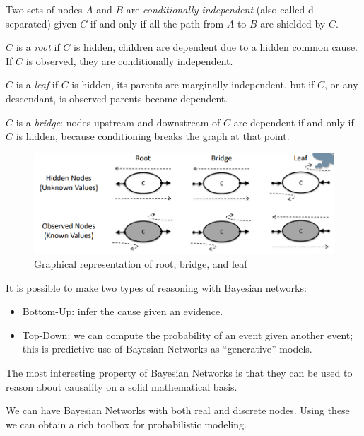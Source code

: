 \documentclass[12pt, a4paper]{report}
\begin{document}
    \begin{definition}
        Two sets of nodes $A$ and $B$ are \emph{conditionally independent} (also called d-separated) given $C$ if and only if all the path from $A$ to $B$ are shielded by $C$.

        $C$ is a \emph{root} if $C$ is hidden, children are dependent due to a hidden common cause. If $C$ is observed, they are conditionally independent. 

        $C$ is a \emph{leaf} if $C$ is hidden, its parents are marginally independent, but if $C$, or any descendant, is observed parents become dependent.

        $C$ is a \emph{bridge}: nodes upstream and downstream of $C$ are dependent if and only if $C$ is hidden, because conditioning breaks the graph at that point.
    \end{definition}
    \begin{figure}[H]
        \centering
        \includegraphics[width=1\linewidth]{images/def.png}
        \caption{Graphical representation of root, bridge, and leaf}
    \end{figure}

    It is possible to make two types of reasoning with Bayesian networks: 
    \begin{itemize}
        \item Bottom-Up: infer the cause given an evidence. 
        \item Top-Down: we can compute the probability of an event given another event; this is predictive use of Bayesian Networks as “generative” models.
    \end{itemize}
    The most interesting property of Bayesian Networks is that they can be used to reason about causality on a solid mathematical basis. 

    We can have Bayesian Networks with both real and discrete nodes. Using these we can obtain a rich toolbox for probabilistic modeling. 
\end{document}
